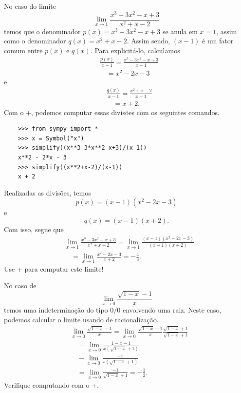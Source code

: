 \begin{ex}
  No caso do limite
  \begin{equation}
    \lim_{x\to 1} \frac{x^3-3x^2-x+3}{x^2+x-2}
  \end{equation}
  temos que o denominador $p(x) = x^3-3x^2-x+3$ se anula em $x=1$, assim como o denominador $q(x) = x^2+x-2$. Assim sendo, $(x-1)$ é um fator comum entre $p(x)$ e $q(x)$. Para explicitá-lo, calculamos
  \begin{align}
    & \frac{p(x)}{x-1} = \frac{x^3-3x^2-x+3}{x-1}\\
    & \text{}\quad = x^2-2x-3
  \end{align}
  e
  \begin{align}
    & \frac{q(x)}{x-1} = \frac{x^2+x-2}{x-1}\\
    & \text{}\quad = x+2.
  \end{align}
  \ifispython
  Com o {\python}+{\sympy}, podemos computar essas divisões com os seguintes comandos.
  \begin{lstlisting}
    >>> from sympy import *
    >>> x = Symbol("x")
    >>> simplify((x**3-3*x**2-x+3)/(x-1))
    x**2 - 2*x - 3
    >>> simplify((x**2+x-2)/(x-1))
    x + 2
  \end{lstlisting}
  \fi
  Realizadas as divisões, temos
  \begin{equation}
    p(x) = (x-1)(x^2-2x-3)
  \end{equation}
  e
  \begin{equation}
    q(x)=(x-1)(x+2).
  \end{equation}
  Com isso, segue que
  \begin{align}
    & \lim_{x\to 1} \frac{x^3-3x^2-x+3}{x^2+x-2} = \lim_{x\to 1} \frac{(x-1)(x^2-2x-3)}{(x-1)(x+2)} \\
    & \text{}\quad = \lim_{x\to 1} \frac{x^2-2x-3}{x+2} = -\frac{4}{3}.
  \end{align}
  \ifispython
  Use {\python}+{\sympy} para computar este limite!
  \fi
\end{ex}

\begin{ex}
  No caso de
  \begin{equation}
    \lim_{x\to 0} \frac{\sqrt{1-x}-1}{x}
  \end{equation}
  temos uma indeterminação do tipo $0/0$ envolvendo uma raiz. Neste caso, podemos calcular o limite usando de racionalização.
  \begin{align}
    & \lim_{x\to 0} \frac{\sqrt{1-x}-1}{x} = \lim_{x\to 0} \frac{\sqrt{1-x}-1}{x}\frac{\sqrt{1-x}+1}{\sqrt{1-x}+1} \\
    & \text{}\quad = \lim_{x\to 0} \frac{1-x-1}{x(\sqrt{1-x}+1)} \\
    & \text{}\quad - \lim_{x\to 0} \frac{-x}{x(\sqrt{1-x}+1)} \\
    & \text{}\quad = \lim_{x\to 0} \frac{-1}{\sqrt{1-x}+1} = -\frac{1}{2}.
  \end{align}
  \ifispython
  Verifique computando com o {\python}+{\sympy}. 
  \fi
\end{ex}

